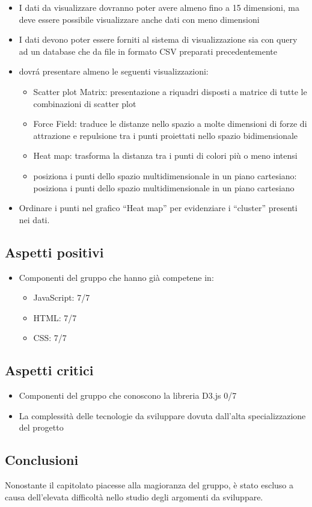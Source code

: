 \documentclass[a4paper, oneside, dvipsnames, table]{article}
\begin{document}
\begin{itemize}
\item I dati da visualizzare dovranno poter avere almeno fino a 15
dimensioni, ma deve essere possibile visualizzare anche dati con meno dimensioni
\item I dati devono poter essere forniti al sistema di visualizzazione sia con query ad un database che da file in formato CSV preparati precedentemente
\item dovr\'a presentare almeno le seguenti visualizzazioni:
\begin{itemize}
\item Scatter plot Matrix: presentazione a riquadri disposti a matrice di tutte le combinazioni di scatter plot
\item Force Field: traduce le distanze nello spazio a molte dimensioni di forze di attrazione e repulsione tra i punti proiettati nello spazio bidimensionale
\item Heat map: trasforma la distanza tra i punti di colori più o meno intensi
\item  posiziona i punti dello spazio multidimensionale in un piano
cartesiano: posiziona i punti dello spazio multidimensionale in un piano
cartesiano
\end{itemize}
\item Ordinare i punti nel grafico “Heat map” per evidenziare i “cluster” presenti nei dati.
\end{itemize}

\subsection{Aspetti positivi}
\begin{itemize}
\item Componenti del gruppo che hanno già competene in:
\begin{itemize}
    \item JavaScript: 7/7
    \item HTML: 7/7
    \item CSS: 7/7
\end{itemize}
\end{itemize}

\subsection{Aspetti critici}
\begin{itemize}
\item Componenti del gruppo che conoscono la libreria D3.js 0/7
\item La complessità delle tecnologie da sviluppare dovuta dall'alta specializzazione del progetto
\end{itemize}

\subsection{Conclusioni}
Nonostante il capitolato piacesse alla magioranza del gruppo, è stato escluso a causa dell'elevata difficoltà nello studio degli argomenti da sviluppare.
\end{document}
